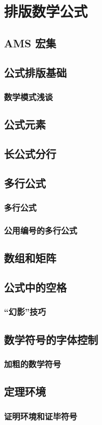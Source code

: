 \chapter{排版数学公式}

\section{AMS 宏集}

\section{公式排版基础}

\subsection{数学模式浅谈}

\section{公式元素}

\section{长公式分行}

\section{多行公式}

\subsection{多行公式}

\subsection{公用编号的多行公式}

\section{数组和矩阵}

\section{公式中的空格}

\subsection{“幻影”技巧}

\section{数学符号的字体控制}

\subsection{加粗的数学符号}

\section{定理环境}

\subsection{证明环境和证毕符号}

\endinput